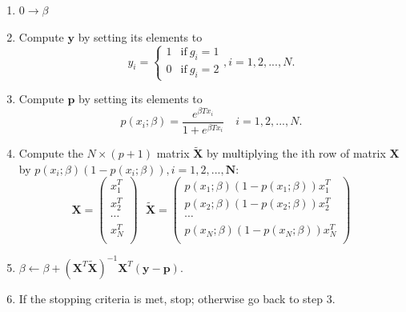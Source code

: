 \documentclass[12pt,notes,mathserif]{beamer}
\providecommand{\tightlist}{%
  \setlength{\itemsep}{0pt}\setlength{\parskip}{0pt}}
\begin{document}
\begin{frame}[c]
	\frametitle{}
	\begin{enumerate}
		\tightlist
		\item $0\to \beta$
		\item Compute $\bm{y}$ by setting its elements to
		      \begin{equation*}
			      y_i =\left\{
			      \begin{array}{ll}
				      1 & \text{if} ~g_i = 1 \\
				      0 & \text{if} ~g_i = 2
			      \end{array},
			      \right.
			      i = 1,2,...,N.
		      \end{equation*}
		\item Compute $\bm{p}$ by setting its elements to
		      \begin{equation*}
			      p(x_i;\beta)=\dfrac{e^{\beta Tx_i}}{1+e^{\beta Tx_i}}\quad
			      i=1,2,...,N.
		      \end{equation*}
		\item Compute the $N \times (p + 1)$ matrix $\tilde{\mathbf{X}}$ by multiplying the ith row of matrix $\mathbf{X}$ by $p(x_i ;\beta)(1 − p(x_i ;\beta)), i = 1,2,...,\mathbf{N}$:
		      \begin{equation*}
			      \mathbf{X}=
			      \begin{pmatrix}
				      x_1^T  \\
				      x_2^T  \\
				      \cdots \\
				      x_N^T  \\
			      \end{pmatrix}~~~
			      \tilde{\mathbf{X}}=
			      \begin{pmatrix}
				      p(x_1;\beta)(1-p(x_1;\beta))x_1^T \\
				      p(x_2;\beta)(1-p(x_2;\beta))x_2^T \\
				      \cdots                            \\
				      p(x_N;\beta)(1-p(x_N;\beta))x_N^T \\
			      \end{pmatrix}
		      \end{equation*}
		\item $\beta\leftarrow \beta+(\mathbf{X}^T\tilde{\mathbf{X}})^{-1}\mathbf{X}^T(\bm{y}-\bm{p})$.
		\item If the stopping criteria is met, stop; otherwise go back to step 3.
	\end{enumerate}
\end{frame}
\end{document}
